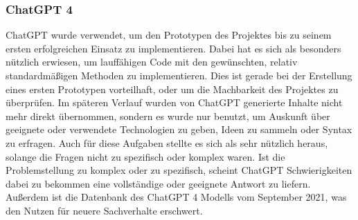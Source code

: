 \subsubsection{ChatGPT 4}
ChatGPT wurde verwendet, um den Prototypen des Projektes bis zu seinem ersten erfolgreichen Einsatz zu implementieren. Dabei hat es sich als besonders nützlich erwiesen, um lauffähigen Code mit den gewünschten, relativ standardmäßigen Methoden zu implementieren. Dies ist gerade bei der Erstellung eines ersten Prototypen vorteilhaft, oder um die Machbarkeit des Projektes zu überprüfen. Im späteren Verlauf wurden von ChatGPT generierte Inhalte nicht mehr direkt übernommen, sondern es wurde nur benutzt, um Auskunft über geeignete oder verwendete Technologien zu geben, Ideen zu sammeln oder Syntax zu erfragen. Auch für diese Aufgaben stellte es sich als sehr nützlich heraus, solange die Fragen nicht zu spezifisch oder komplex waren. Ist die Problemstellung zu komplex oder zu spezifisch, scheint ChatGPT Schwierigkeiten dabei zu bekommen eine vollständige oder geeignete Antwort zu liefern. Außerdem ist die Datenbank des ChatGPT 4 Modells vom September 2021, was den Nutzen für neuere Sachverhalte erschwert.